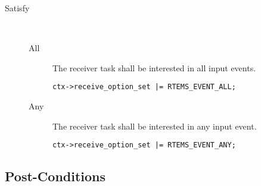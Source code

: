 \begin{description}
  \item[Satisfy]~
  \begin{description}
  \item[All]
    The receiver task shall be interested in all input events.
\begin{verbatim}
ctx->receive_option_set |= RTEMS_EVENT_ALL;
\end{verbatim}
  \item[Any]
    The receiver task shall be interested in any input event.
\begin{verbatim}
ctx->receive_option_set |= RTEMS_EVENT_ANY;
\end{verbatim}
  \end{description}

\end{description}


\subsection{Post-Conditions}

